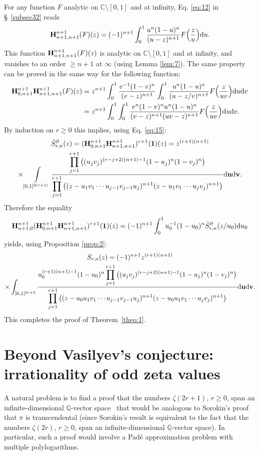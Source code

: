 \documentclass[reqno,12pt]{amsart}
\numberwithin{equation}{section}
\theoremstyle{remark}
\def\dd{\textup{d}}
\newcommand{\Q}{\mathbb{Q}}
\newcommand{\C}{\mathbb{C}}
\newcommand{\BBB}{{\bf H}}
\newcommand{\opb}{\BBB^{n+1}_{0,n+1}\BBB^{n+1}_{n+1,n+1}}
\begin{document}
For any  function $F$ analytic on $\C\setminus [0,1]$ and at infinity,  Eq. \eqref{eq:12} in \S~\ref{subsec32} reads
$$
\BBB^{n+1}_{n+1,n+1} (F)(z)= (-1)^{n+1}  \int_0^1 \frac{u^n(1-u)^n}{(u-z)^{n+1}}F\Big(\frac zu\Big) \dd u.
$$
This function $\BBB^{n+1}_{n+1,n+1} (F)(z)$ is analytic on $\C\setminus [0,1]$ and at infinity, 
and vanishes to an order $\geq n+1$ at $\infty$ (using Lemma \ref{lem:7}). The same property 
can be proved  in the same way for the following function:
\begin{align*}
 \opb (F)(z)&=z^{n+1}\int_0^1 \frac{v^{-1}(1-v)^n}{(v-z)^{n+1}}
 \int_0^1\frac{u^n(1-u)^n}{(u-z/v)^{n+1}}F\Big(\frac z{uv}\Big) \dd u \dd v 
\\
&=z^{n+1}\int_0^1\int_0^1\frac{v^n(1-v)^nu^n(1-u)^n}{(v-z)^{n+1}(uv-z)^{n+1}}F\Big(\frac z{uv}\Big) \dd u \dd v.
\end{align*}
By induction on $r\ge 0$ this implies, using Eq. \eqref{eq:15}:
\begin{multline*}
\tilde{S}_{r,n}^{\partial}(z) = (\opb)^{r+1} (\boldsymbol{1})(z) =  z^{(r+1)(n+1)}
\\\times \int\limits_{[0,1]^{2(r+1)}}\frac{\displaystyle \prod_{j=1}^{r+1}\big((u_jv_j)^{(r-j+2)(n+1)-1}(1-u_j)^n(1-v_j)^n\big)}
{\displaystyle \prod_{j=1}^{r+1} \big((z-u_1v_1\cdots u_{j-1}v_{j-1}u_j)^{n+1}(z-u_1v_1\cdots u_{j}v_{j})^{n+1}\big)}
  \dd {\bf u} \dd {\bf v}.
\end{multline*}
Therefore the equality
$$
\BBB^{ n+1}_{n+1,0} (\opb)^{r+1} (\boldsymbol{1})(z)  = 
(-1)^{ n+1}  \int_0^1 u_0^{-1}(1-u_0)^{  n} \tilde{S}_{r,n}^{\partial}(z/u_0) \dd u_0
$$
yields, using Proposition \ref{prop:2}:
\begin{multline*}
S_{r,n}(z)=(-1)^{ n+1}z^{(r+1)  (n+1)} \\
\times \int_{[0,1]^{2r+3}} 
\frac{\displaystyle u_0^{(r+1) (n+1)-1}(1-u_0)^{ n} 
\prod_{j=1}^{r+1}\big((u_jv_j)^{(r-j+2)(n+1)-1}(1-u_j)^n(1-v_j)^n\big)}
{\displaystyle \prod_{j=1}^{r+1}\big((z-u_0u_1v_1\cdots u_{j-1}v_{j-1}u_j)^{n+1}
(z-u_0u_1v_1\cdots u_{j}v_{j})^{n+1}\big)} \dd{\bf u}\dd{\bf v}.
\end{multline*}
This completes the proof of Theorem~\ref{theo:1}.

\section{Beyond Vasilyev's conjecture: irrationality of odd zeta values} \label{subsecinf}

A natural problem is  to find a  
proof that the numbers  $\zeta(2r+1)$, $r\geq 0$, span an infinite-dimensional $\Q$-vector space~\cite{BR, rivoal}  
that would be analogous to Sorokin's proof that $\pi$ is transcendental \cite{sorokin1} 
(since Sorokin's result is equivalent to the fact that the numbers  $\zeta(2r)$, $r\geq 0$, 
span an infinite-dimensional $\Q$-vector space). In particular, such a proof would involve a 
Pad\'e approximation problem with multiple polylogarithms.
\end{document}
